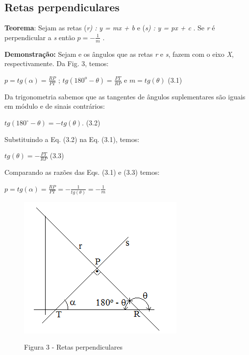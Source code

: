 \subsection{Retas perpendiculares}

\textbf{Teorema}: Sejam as retas    (\textit{r) :}   \textit{y = mx + b}   e   (\textit{s) :}   \textit{y = px + c}    . Se \textit{r} é perpendicular a  \textit{s}  então      \( p=-\frac{1}{m} \)   .

\textbf{Demonstração:} Sejam    e    os ângulos que as retas \textit{r} e \textit{s}, fazem com o eixo \textit{X}, respectivamente. Da Fig. 3, temos:

 \( p=tg \left(  \alpha  \right) =\frac{RP}{PT} \)    ;    \( tg \left( 180^{o}- \theta  \right) =\frac{PT}{RP} \)       e    \tab  \( m=tg \left(  \theta  \right)  \) \tab \tab (3.1)

Da trigonometria sabemos que as tangentes de ângulos suplementares são iguais em módulo e de sinais contrários:

\begin{FlushRight}
 \( tg \left( 180 ^{\circ} - \theta  \right)  =-tg \left(  \theta  \right)  \). \tab (3.2)
\end{FlushRight}

Substituindo a Eq. (3.2) na Eq. (3.1), temos:

\begin{FlushRight}
 \( tg \left(  \theta  \right) =-\frac{PT}{RP} \) \tab (3.3)
\end{FlushRight}

Comparando as razões das Eqs. (3.1) e (3.3) temos:

\( p=tg \left(  \alpha  \right) =\frac{RP}{PT}=-\frac{1}{tg \left(  \theta  \right) }=-\frac{1}{m} \)

\begin{figure}[H]
	\begin{Center}
		\includegraphics[width=3.24in,height=2.79in]{capitulos/funcao_do_primeiro_grau/media/image67.png}

		Figura 3 - Retas perpendiculares
	\end{Center}
\end{figure}